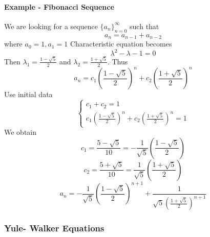 \documentclass[11pt]{article}
\begin{document}
\paragraph{Example - Fibonacci Sequence}
We are looking for a sequence $\{a_n\}_{n=0}^\infty$ such that
$$a_n = a_{n-1} + a_{n-2}$$
where $a_0 = 1, a_1 = 1$
Characteristic equation becomes
$$\lambda^2 - \lambda - 1 = 0$$
Then $\lambda_1 = \frac{1 - \sqrt{5}}{2}$ and $\lambda_2 = \frac{1 + \sqrt{5}}{2}$.
Thus
$$a_n = c_1(\frac{1 - \sqrt{5}}{2})^n + c_2(\frac{1 + \sqrt{5}}{2})^n$$
Use initial data
$$\begin{cases}
	c_1 + c_2 = 1 \\
	c_1(\frac{1 - \sqrt{5}}{2})^n + c_2(\frac{1 + \sqrt{5}}{2})^n = 1
\end{cases}$$
We obtain
$$c_1 = \frac{5 - \sqrt{5}}{10} = -\frac{1}{\sqrt{5}}(\frac{1 - \sqrt{5}}{2})$$
$$c_2 = \frac{5 + \sqrt{5}}{10} = \frac{1}{\sqrt{5}}(\frac{1 + \sqrt{5}}{2})$$
$$a_n = -\frac{1}{\sqrt{5}}(\frac{1 - \sqrt{5}}{2})^{n+1} + \frac{1}{\sqrt{5}(\frac{1 + \sqrt{5}}{2})^{n+1}}$$

\subsubsection{Yule- Walker Equations}
\end{document}
